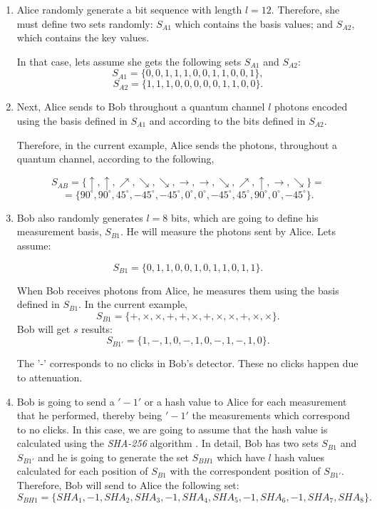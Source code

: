 \begin{enumerate}
  \item Alice randomly generate a bit sequence with length $l=12$.
      Therefore, she must define two sets randomly: $S_{A1}$ which contains the basis values; and $S_{A2}$, which contains the key values.

      In that case, lets assume she gets the following sets $S_{A1}$ and $S_{A2}$:
      $$S_{A1} = \{0,0,1,1,1,0,0,1,1,0,0,1 \},$$
      $$S_{A2} = \{1,1,1,0,0,0,0,0,1,1,0,0 \}.$$

  \item Next, Alice sends to Bob throughout a quantum channel $l$ photons encoded using the basis defined in $S_{A1}$ and according to the bits defined in $S_{A2}$.

      Therefore, in the current example, Alice sends the photons, throughout a quantum channel, according to the following,

      $$S_{AB} = \{\uparrow,\uparrow, \nearrow, \searrow, \searrow, \to, \to, \searrow, \nearrow,\uparrow, \to, \searrow \} =$$
      $$ =\{90^{\circ},90^{\circ}, 45^{\circ}, -45^{\circ},-45^{\circ}, 0^{\circ}, 0^{\circ}, -45^{\circ}, 45^{\circ},90^{\circ}, 0^{\circ}, -45^{\circ} \}.$$


  \item Bob also randomly generates $l=8$ bits, which are going to define his measurement basis, $S_{B1}$. He will measure the photons sent by Alice. Lets assume:

  $$S_{B1} = \{0,1,1,0,0,1,0,1,1,0,1,1 \}.$$

    When Bob receives photons from Alice, he measures them using the basis defined in $S_{B1}$.
  In the current example,
  $$S_{B1} = \{ +,\times,\times,+,+,\times,+,\times, \times,+, \times, \times \}.$$
  Bob will get $s$ results:
  $$S_{B1'} = \{1,-,1,0,-,1,0,-,1,-,1,0 \}.$$

  The '-' corresponds to no clicks in Bob's detector. These no clicks happen due to attenuation.

  \item Bob is going to send a $'-1'$ or a hash value to Alice for each measurement that he performed, thereby being $'-1'$ the measurements which correspond to no clicks. In this case, we are going to assume that the hash value is calculated using the \textit{SHA-256} algorithm \cite{Liu2009}. In detail, Bob has two sets $S_{B1}$ and $S_{B1'}$ and he is going to generate the set $S_{BH1}$ which have $l$ hash values calculated for each position of $S_{B1}$ with the correspondent position of $S_{B1'}$. Therefore, Bob will send to Alice the following set:
      $$S_{BH1}=\{SHA_1,-1,SHA_2,SHA_3, -1,SHA_4,SHA_5,-1,SHA_6,-1,SHA_7,SHA_8 \}.$$



\end{enumerate}
